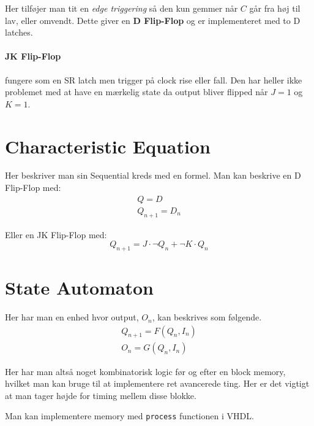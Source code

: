 Her tilføjer man tit en \emph{edge triggering} så den kun gemmer når $C$ går fra høj til lav, eller omvendt.
Dette giver en \textbf{D Flip-Flop} og er implementeret med to D latches.

\paragraph{JK Flip-Flop} fungere som en SR latch men trigger på clock rise eller fall.
Den har heller ikke problemet med at have en mærkelig state da output bliver flipped når $J=1$ og $K=1$.

\section{Characteristic Equation}

Her beskriver man sin Sequential kreds med en formel.
Man kan beskrive en D Flip-Flop med:
\begin{equation*}
    \begin{split}
        Q = D \\
        Q_{n+1} = D_n
    \end{split}
\end{equation*}

Eller en JK Flip-Flop med:
\[
    Q_{n+1} = J \cdot \neg Q_n + \neg K \cdot Q_n
\]

\section{State Automaton}

Her har man en enhed hvor output, $O_n$, kan beskrives som følgende.
\begin{equation*}
    \begin{split}
        Q_{n+1} = F(Q_n, I_n) \\
        O_{n} = G(Q_n, I_n)
    \end{split}
\end{equation*}

Her har man altså noget kombinatorisk logic før og efter en block memory, hvilket man kan bruge til at implementere ret avancerede ting.
Her er det vigtigt at man tager højde for timing mellem disse blokke.

Man kan implementere memory med \texttt{process} functionen i VHDL.
